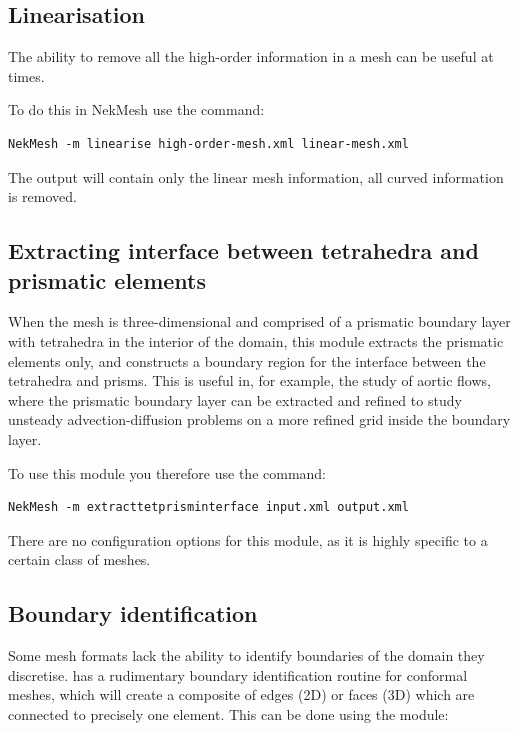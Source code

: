 \subsection{Linearisation}

The ability to remove all the high-order information in a mesh can be useful
at times.

To do this in NekMesh use the command:

\begin{lstlisting}[style=BashInputStyle]
  NekMesh -m linearise high-order-mesh.xml linear-mesh.xml
\end{lstlisting}

The output will contain only the linear mesh information, all curved information
is removed.

\subsection{Extracting interface between tetrahedra and prismatic elements}

When the mesh is three-dimensional and comprised of a prismatic boundary layer
with tetrahedra in the interior of the domain, this module extracts the
prismatic elements only, and constructs a boundary region for the interface
between the tetrahedra and prisms. This is useful in, for example, the study of
aortic flows, where the prismatic boundary layer can be extracted and refined to
study unsteady advection-diffusion problems on a more refined grid inside the
boundary layer.

To use this module you therefore use the command:

\begin{lstlisting}[style=BashInputStyle]
  NekMesh -m extracttetprisminterface input.xml output.xml
\end{lstlisting}

There are no configuration options for this module, as it is highly specific to
a certain class of meshes.

\subsection{Boundary identification}

Some mesh formats lack the ability to identify boundaries of the domain they
discretise. \mc has a rudimentary boundary identification routine for conformal
meshes, which will create a composite of edges (2D) or faces (3D) which are
connected to precisely one element. This can be done using the 
module:


